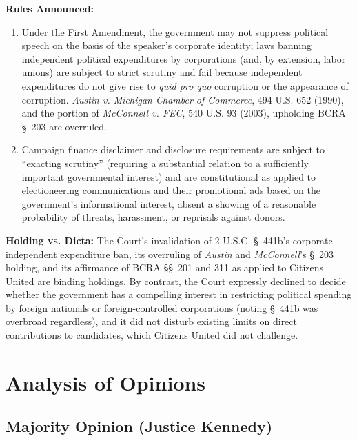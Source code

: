 \documentclass[12pt]{article}
\begin{document}
\textbf{Rules Announced:}
\begin{enumerate}
  \item Under the First Amendment, the government may not suppress political speech on the basis of the speaker's corporate identity; laws banning independent political expenditures by corporations (and, by extension, labor unions) are subject to strict scrutiny and fail because independent expenditures do not give rise to \textit{quid pro quo} corruption or the appearance of corruption. \textit{Austin v. Michigan Chamber of Commerce}, 494 U.S. 652 (1990), and the portion of \textit{McConnell v. FEC}, 540 U.S. 93 (2003), upholding BCRA \S~203 are overruled.
  \item Campaign finance disclaimer and disclosure requirements are subject to ``exacting scrutiny'' (requiring a substantial relation to a sufficiently important governmental interest) and are constitutional as applied to electioneering communications and their promotional ads based on the government's informational interest, absent a showing of a reasonable probability of threats, harassment, or reprisals against donors.
\end{enumerate}

\textbf{Holding vs. Dicta:} The Court's invalidation of 2 U.S.C. \S~441b's corporate independent expenditure ban, its overruling of \textit{Austin} and \textit{McConnell}'s \S~203 holding, and its affirmance of BCRA \S\S~201 and 311 as applied to Citizens United are binding holdings. By contrast, the Court expressly declined to decide whether the government has a compelling interest in restricting political spending by foreign nationals or foreign-controlled corporations (noting \S~441b was overbroad regardless), and it did not disturb existing limits on direct contributions to candidates, which Citizens United did not challenge.

\section{Analysis of Opinions}

\subsection{Majority Opinion (Justice Kennedy)}
\end{document}

